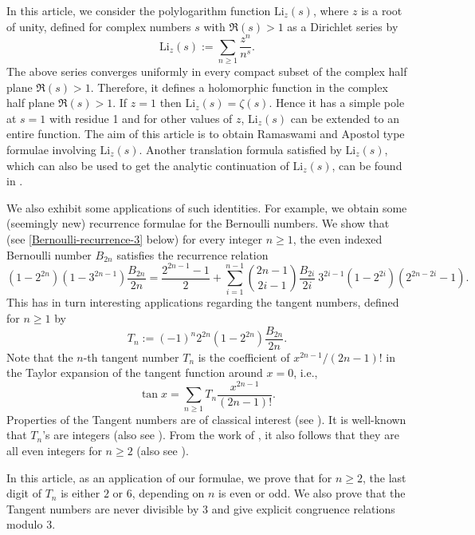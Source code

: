 \documentclass[12pt]{amsart}
\begin{document}
 In this article, we consider the polylogarithm function $\mathrm{Li}_z(s)$, where $z$ is a root of unity,
 defined for complex numbers $s$ with $\Re(s)>1$ as a Dirichlet series by
\begin{equation}
\mathrm{Li}_z(s):=\sum_{n\geq1}\frac{z^n}{n^s}.
\end{equation}
The above series converges uniformly in every compact subset of the complex half plane 
$\Re(s)>1$. Therefore, it defines a holomorphic function in the complex half plane $\Re(s)>1$. If $z=1$ then 
$\mathrm{Li}_z(s)=\zeta(s)$. Hence it has a simple pole at $s=1$ with residue 1 and for other values of $z$,
$\mathrm{Li}_z(s)$ can be extended to an entire function. 
The aim of this article is to obtain Ramaswami and Apostol type formulae involving $\mathrm{Li}_z(s)$.
Another translation formula satisfied by $\mathrm{Li}_z(s)$, which can also be used to get the analytic continuation
of $\mathrm{Li}_z(s)$, can be found in \cite{BS}.


We also exhibit some applications of such identities. 
For example, we obtain some (seemingly new) recurrence formulae for the Bernoulli numbers.
We show that (see \eqref{Bernoulli-recurrence-3} below) for every integer $n\geq 1$, 
the even indexed Bernoulli number $B_{2n}$ satisfies the recurrence relation
$$
(1-2^{2n})(1-3^{2n-1})\frac{B_{2n}}{2n}= \frac{2^{2n-1}-1}{2} +\sum_{i=1}^{n-1}\binom{2n-1}{2i-1}\frac{B_{2i}}{2i} \ 3^{2i-1}(1-2^{2i})(2^{2n-2i}-1).
$$
This has in turn interesting applications regarding the tangent numbers, defined for $n \ge 1$ by
$$
T_n:=(-1)^{n}2^{2n}(1-2^{2n})\frac{B_{2n}}{2n}.
$$
Note that the $n$-th tangent number $T_n$ is the coefficient of $x^{2n-1}/(2n-1)!$ in the Taylor expansion
of the tangent function around $x=0$, i.e.,
$$
\tan x= \sum_{n \ge 1} T_n \frac{x^{2n-1}}{(2n-1)!}.
$$
Properties of the Tangent numbers are of classical interest (see \cite{KB}).
It is well-known that $T_n$'s are integers \cite{KB} (also see \cite[Remark 1.18]{AIK}).
From the work of \cite{HL}, it also follows that they are all even integers for $n \ge 2$ (also see \cite{ZLZ}).

In this article, as an application of our formulae, we prove that for $n \ge 2$, the last digit of $T_n$ is either $2$ or $6$,
depending on $n$ is even or odd. We also prove that the Tangent numbers are never divisible by $3$ and give
explicit congruence relations modulo $3$.
\end{document}
